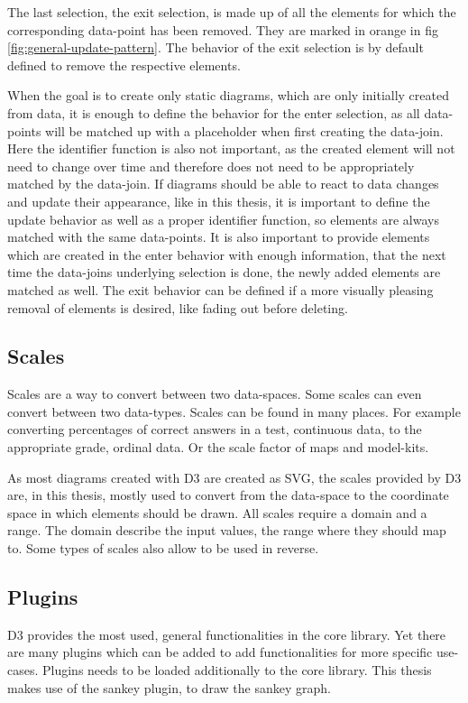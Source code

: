 The last selection, the exit selection, is made up of all the elements for which the corresponding data-point has been removed. They are marked in orange in fig \ref{fig:general-update-pattern}. The behavior of the exit selection is by default defined to remove the respective elements.

When the goal is to create only static diagrams, which are only initially created from data, it is enough to define the behavior for the enter selection, as all data-points will be matched up with a placeholder when first creating the data-join. Here the identifier function is also not important, as the created element will not need to change over time and therefore does not need to be appropriately matched by the data-join. If diagrams should be able to react to data changes and update their appearance, like in this thesis, it is important to define the update behavior as well as a proper identifier function, so elements are always matched with the same data-points. It is also important to provide elements which are created in the enter behavior with enough information, that the next time the data-joins underlying selection is done, the newly added elements are matched as well. The exit behavior can be defined if a more visually pleasing removal of elements is desired, like fading out before deleting.


\subsection{Scales}

Scales are a way to convert between two data-spaces. Some scales can even convert between two data-types. Scales can be found in many places. For example converting percentages of correct answers in a test, continuous data, to the appropriate grade, ordinal data. Or the scale factor of maps and model-kits.

As most diagrams created with D3 are created as SVG, the scales provided by D3 are, in this thesis, mostly used to convert from the data-space to the coordinate space in which elements should be drawn. All scales require a domain and a range. The domain describe the input values, the range where they should map to. Some types of scales also allow to be used in reverse. 

\subsection{Plugins}

D3 provides the most used, general functionalities in the core library. Yet there are many plugins which can be added to add functionalities for more specific use-cases. Plugins needs to be loaded additionally to the core library. This thesis makes use of the sankey plugin\cite{sankey_package}, to draw the sankey graph.

